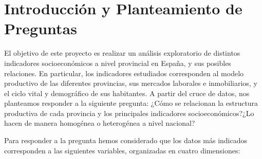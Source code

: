 \documentclass[,article,submit,moreauthors,pdftex]{Definitions/mdpi}
\begin{document}

\section{Introducción y Planteamiento de
Preguntas}\label{introducciuxf3n-y-planteamiento-de-preguntas}

El objetivo de este proyecto es realizar un análisis exploratorio de
distintos indicadores socioeconómicos a nivel provincial en España, y
sus posibles relaciones. En particular, los indicadores estudiados
corresponden al modelo productivo de las diferentes provincias, sus
mercados laborales e inmobiliarios, y el ciclo vital y demográfico de
sus habitantes. A partir del cruce de datos, nos planteamos responder a
la siguiente pregunta: ¿Cómo se relacionan la estructura productiva de
cada provincia y los principales indicadores socioeconómicos?¿Lo hacen
de manera homogénea o heterogénea a nivel nacional?

Para responder a la pregunta hemos considerado que los datos más
indicados corresponden a las siguientes variables, organizadas en cuatro
dimensiones:
\end{document}
